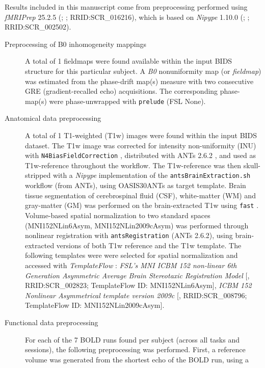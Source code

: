 \documentclass[
]{article}
\author{}
\date{}
\begin{document}
Results included in this manuscript come from preprocessing performed
using \emph{fMRIPrep} 25.2.5 (\citet{fmriprep1}; \citet{fmriprep2};
RRID:SCR\_016216), which is based on \emph{Nipype} 1.10.0
(\citet{nipype1}; \citet{nipype2}; RRID:SCR\_002502).

\begin{description}
\item[Preprocessing of B0 inhomogeneity mappings]
A total of 1 fieldmaps were found available within the input BIDS
structure for this particular subject. A \emph{B0} nonuniformity map (or
\emph{fieldmap}) was estimated from the phase-drift map(s) measure with
two consecutive GRE (gradient-recalled echo) acquisitions. The
corresponding phase-map(s) were phase-unwrapped with \texttt{prelude}
(FSL None).
\item[Anatomical data preprocessing]
A total of 1 T1-weighted (T1w) images were found within the input BIDS
dataset. The T1w image was corrected for intensity non-uniformity (INU)
with \texttt{N4BiasFieldCorrection} \citep{n4}, distributed with ANTs
2.6.2 \citep[RRID:SCR\_004757]{ants}, and used as T1w-reference
throughout the workflow. The T1w-reference was then skull-stripped with
a \emph{Nipype} implementation of the \texttt{antsBrainExtraction.sh}
workflow (from ANTs), using OASIS30ANTs as target template. Brain tissue
segmentation of cerebrospinal fluid (CSF), white-matter (WM) and
gray-matter (GM) was performed on the brain-extracted T1w using
\texttt{fast} \citep[FSL (version unknown),
RRID:SCR\_002823,][]{fsl_fast}. Volume-based spatial normalization to
two standard spaces (MNI152NLin6Asym, MNI152NLin2009cAsym) was performed
through nonlinear registration with \texttt{antsRegistration} (ANTs
2.6.2), using brain-extracted versions of both T1w reference and the T1w
template. The following templates were were selected for spatial
normalization and accessed with \emph{TemplateFlow}
\citep[25.0.4,][]{templateflow}: \emph{FSL's MNI ICBM 152 non-linear 6th
Generation Asymmetric Average Brain Stereotaxic Registration Model}
{[}\citet{mni152nlin6asym}, RRID:SCR\_002823; TemplateFlow ID:
MNI152NLin6Asym{]}, \emph{ICBM 152 Nonlinear Asymmetrical template
version 2009c} {[}\citet{mni152nlin2009casym}, RRID:SCR\_008796;
TemplateFlow ID: MNI152NLin2009cAsym{]}.
\item[Functional data preprocessing]
For each of the 7 BOLD runs found per subject (across all tasks and
sessions), the following preprocessing was performed. First, a reference
volume was generated from the shortest echo of the BOLD run, using a

\end{description}
\end{document}
